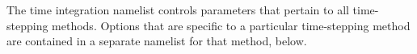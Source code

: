 The time integration namelist controls parameters that pertain to all time-stepping methods.  Options that are specific to a particular time-stepping method are contained in a separate namelist for that method, below.
